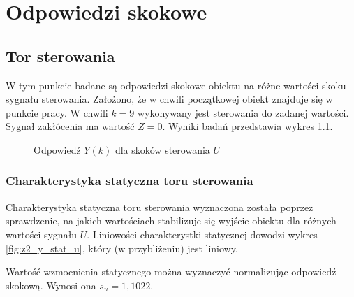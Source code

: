\chapter{Odpowiedzi skokowe}
\section{Tor sterowania}
W tym punkcie badane są odpowiedzi skokowe obiektu na różne wartości skoku sygnału sterowania. Założono, że w chwili początkowej obiekt znajduje się w punkcie pracy. W chwili $k=9$ wykonywany jest sterowania do zadanej wartości. Sygnał zakłócenia ma wartość $Z=0$. Wyniki badań przedstawia wykres \ref{fig:z2_yu}.
\begin{figure}[!htb]
	\centering
	\caption{Odpowiedź $Y(k)$ dla skoków sterowania $U$}
\label{fig:z2_yu}
\end{figure}

\subsection{Charakterystyka statyczna toru sterowania}
Charakterystyka statyczna toru sterowania wyznaczona została poprzez sprawdzenie, na jakich wartościach stabilizuje się wyjście obiektu dla różnych wartości sygnału $U$. Liniowości charakterystki statycznej dowodzi wykres \ref{fig:z2_y_stat_u}, który (w przybliżeniu) jest liniowy.

Wartość wzmocnienia statycznego można wyznaczyć normalizując odpowiedź skokową. Wynosi ona $s_u=1,1022$.

